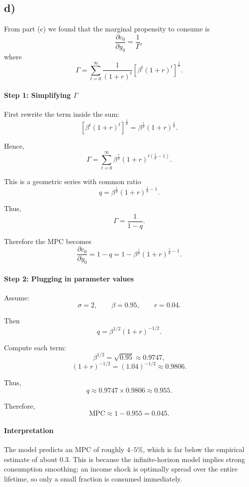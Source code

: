 \documentclass[12pt]{article}
\begin{document}
\subsection{d)}

From part (c) we found that the marginal propensity to consume is
\[
\frac{\partial c_0}{\partial y_0}
=
\frac{1}{\Gamma},
\]
where
\[
\Gamma
=
\sum_{t=0}^{\infty}
\frac{1}{(1+r)^t}
[\beta^t (1+r)^t]^{\frac{1}{\sigma}}.
\]

\paragraph{Step 1: Simplifying $\Gamma$}

First rewrite the term inside the sum:
\[
[\beta^t (1+r)^t]^{\frac{1}{\sigma}}
=
\beta^{\frac{t}{\sigma}} (1+r)^{\frac{t}{\sigma}}.
\]

Hence,
\[
\Gamma
=
\sum_{t=0}^{\infty}
\beta^{\frac{t}{\sigma}}
(1+r)^{t\left(\frac{1}{\sigma}-1\right)}.
\]

This is a geometric series with common ratio
\[
q
=
\beta^{\frac{1}{\sigma}}
(1+r)^{\frac{1}{\sigma}-1}.
\]

Thus,
\[
\Gamma
=
\frac{1}{1-q}.
\]

Therefore the MPC becomes
\[
\boxed{
\frac{\partial c_0}{\partial y_0}
=
1-q
=
1-
\beta^{\frac{1}{\sigma}}
(1+r)^{\frac{1}{\sigma}-1}
}.
\]

\paragraph{Step 2: Plugging in parameter values}

Assume:
\[
\sigma = 2, 
\qquad
\beta = 0.95,
\qquad
r = 0.04.
\]

Then
\[
q
=
\beta^{1/2}
(1+r)^{-1/2}.
\]

Compute each term:
\[
\beta^{1/2}
=
\sqrt{0.95}
\approx 0.9747,
\]
\[
(1+r)^{-1/2}
=
(1.04)^{-1/2}
\approx 0.9806.
\]

Thus,
\[
q
\approx
0.9747 \times 0.9806
\approx 0.955.
\]

Therefore,
\[
\boxed{
\text{MPC}
\approx
1 - 0.955
=
0.045.
}
\]

\paragraph{Interpretation}

The model predicts an MPC of roughly $4$--$5\%$, which is far below the empirical estimate of about $0.3$. This is because the infinite-horizon model implies strong consumption smoothing: an income shock is optimally spread over the entire lifetime, so only a small fraction is consumed immediately.
\end{document}
